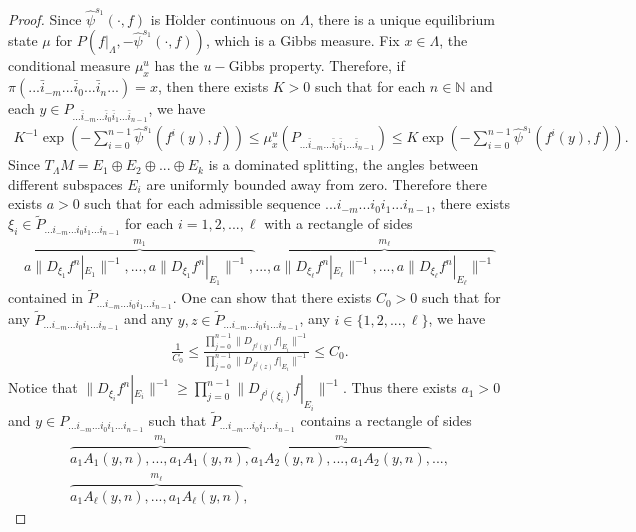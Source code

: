 \documentclass[11pt,a4paper]{amsart}
\theoremstyle{plain}
\theoremstyle{remark}
\begin{document}
\begin{proof}
		Since $\hat{\psi}^{s_{1}}(\cdot,f)$ is H$\ddot{\text{o}}$lder continuous on $\Lambda$, there is a unique equilibrium state $\mu$ for $P(f|_{\Lambda},-\hat{\psi}^{s_{1}}(\cdot,f))$, which is a Gibbs measure. Fix $x\in\Lambda$, the conditional measure
		$\mu_{x}^{u}$ has the $u-$Gibbs property. Therefore, if $\pi(...\bar{i}_{-m}...\bar{i}_{0}...\bar{i}_{n}...)=x$, then there exists $K>0$ such that for each $n\in \mathbb{N}$ and each $y\in P_{...\bar{i}_{-m}...\bar{i}_{0}\bar{i}_{1}...\bar{i}_{n-1}}$, we have
		\begin{align*}
			K^{-1}\exp(-\sum_{i=0}^{n-1}\hat{\psi}^{s_{1}}(f^{i}(y),f))\leq \mu_{x}^{u}(P_{...\bar{i}_{-m}...\bar{i}_{0}\bar{i}_{1}...\bar{i}_{n-1}})\leq K \exp(-\sum_{i=0}^{n-1}\hat{\psi}^{s_{1}}(f^{i}(y),f)).
		\end{align*}
		Since $T_{\Lambda}M=E_{1}\oplus E_{2}\oplus...\oplus E_{k}$ is a dominated splitting, the angles between different subspaces $E_{i}$ are uniformly bounded away from zero. Therefore there exists $a>0$ such that for each admissible sequence $...i_{-m}...i_{0}i_{1}...i_{n-1}$, there exists $\xi_{i}\in \tilde{P}_{...i_{-m}...i_{0}i_{1}...i_{n-1}}$ for each $i=1,2,...,\ell$ with a rectangle of sides
		\begin{align*}
			\overbrace{a\|D_{\xi_{1}}f^{n}|_{E_{1}}\|^{-1},...,a\|D_{\xi_{1}}f^{n}|_{E_{1}}\|^{-1},}^{m_{1}}...,\overbrace{a\|D_{\xi_{\ell}}f^{n}|_{E_{\ell}}\|^{-1},...,a\|D_{\xi_{\ell}}f^{n}|_{E_{\ell}}\|^{-1}}^{m_{\ell}}
		\end{align*}
		contained in $\tilde{P}_{...i_{-m}...i_{0}i_{1}...i_{n-1}}$. One can show that there exists $C_{0}>0$ such that for any $\tilde{P}_{...i_{-m}...i_{0}i_{1}...i_{n-1}}$ and any $y, z \in \tilde{P}_{...i_{-m}...i_{0}i_{1}...i_{n-1}}$, any $i\in \{1,2,...,\ell\}$, we have
		\begin{align*}
			\frac{1}{C_{0}}\leq \frac{\prod_{j=0}^{n-1}\|D_{f^{j}(y)}f|_{E_{i}}\|^{-1}}{\prod_{j=0}^{n-1}\|D_{f^{j}(z)}f|_{E_{i}}\|^{-1}}\leq C_{0}.
		\end{align*}
		Notice that $\|D_{\xi_{i}}f^{n}|_{E_{i}}\|^{-1}\geq \prod_{j=0}^{n-1}\|D_{f^{j}(\xi_{i})}f|_{E_{i}}\|^{-1}$. Thus there exists $a_{1}>0$ and $y\in P_{...i_{-m}...i_{0}i_{1}...i_{n-1}}$ such that $\tilde{P}_{...i_{-m}...i_{0}i_{1}...i_{n-1}}$ contains a rectangle of sides
		\begin{align*}
			\overbrace{a_{1}A_{1}(y,n),...,a_{1}A_{1}(y,n),}^{m_{1}}\overbrace{a_{1}A_{2}(y,n),...,a_{1}A_{2}(y,n),}^{m_{2}}...,\\
			\overbrace{a_{1}A_{\ell}(y,n),...,a_{1}A_{\ell}(y,n)}^{m_{\ell}},

\end{align*}
\end{proof}
\end{document}
